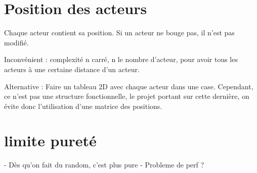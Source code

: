 \documentclass{article}
\begin{document}
\section{Position des acteurs}
Chaque acteur contient sa position.
Si un acteur ne bouge pas, il n'est pas modifié.

Inconvénient : complexité n carré, n le nombre d'acteur, pour avoir tous les acteurs à une certaine distance d'un acteur.

Alternative : Faire un tableau 2D avec chaque acteur dans une case. Cependant, ce n'est pas une structure fonctionnelle, 
le projet portant sur cette dernière, on évite donc l'utilisation d'une matrice des positions.

\section{limite pureté}
- Dès qu'on fait du random, c'est plus pure
- Probleme de perf ?
\end{document}
